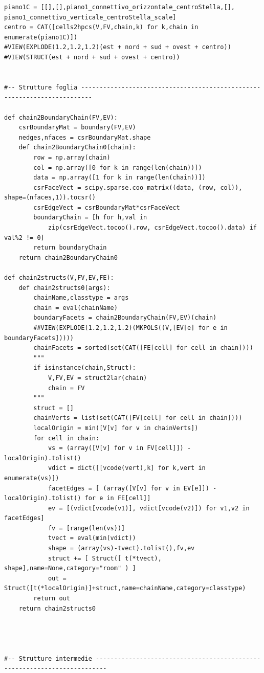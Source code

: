 \documentclass[11pt, oneside]{article}   	%
\begin{document}
\begin{verbatim}
piano1C = [[],[],piano1_connettivo_orizzontale_centroStella,[], piano1_connettivo_verticale_centroStella_scale]
centro = CAT([cells2hpcs(V,FV,chain,k) for k,chain in enumerate(piano1C)])
#VIEW(EXPLODE(1.2,1.2,1.2)(est + nord + sud + ovest + centro))
#VIEW(STRUCT(est + nord + sud + ovest + centro))


#-- Strutture foglia -------------------------------------------------------------------------

def chain2BoundaryChain(FV,EV):
    csrBoundaryMat = boundary(FV,EV)
    nedges,nfaces = csrBoundaryMat.shape   
    def chain2BoundaryChain0(chain):
        row = np.array(chain)
        col = np.array([0 for k in range(len(chain))])
        data = np.array([1 for k in range(len(chain))])
        csrFaceVect = scipy.sparse.coo_matrix((data, (row, col)), shape=(nfaces,1)).tocsr()
        csrEdgeVect = csrBoundaryMat*csrFaceVect
        boundaryChain = [h for h,val in 
            zip(csrEdgeVect.tocoo().row, csrEdgeVect.tocoo().data) if val%2 != 0]
        return boundaryChain
    return chain2BoundaryChain0
 
def chain2structs(V,FV,EV,FE):
    def chain2structs0(args): 
        chainName,classtype = args
        chain = eval(chainName)
        boundaryFacets = chain2BoundaryChain(FV,EV)(chain)
        ##VIEW(EXPLODE(1.2,1.2,1.2)(MKPOLS((V,[EV[e] for e in boundaryFacets]))))
        chainFacets = sorted(set(CAT([FE[cell] for cell in chain])))
        """
        if isinstance(chain,Struct): 
            V,FV,EV = struct2lar(chain)
            chain = FV
        """
        struct = []
        chainVerts = list(set(CAT([FV[cell] for cell in chain])))
        localOrigin = min([V[v] for v in chainVerts])
        for cell in chain:
            vs = (array([V[v] for v in FV[cell]]) - localOrigin).tolist()
            vdict = dict([[vcode(vert),k] for k,vert in enumerate(vs)])
            facetEdges = [ (array([V[v] for v in EV[e]]) - localOrigin).tolist() for e in FE[cell]]
            ev = [(vdict[vcode(v1)], vdict[vcode(v2)]) for v1,v2 in facetEdges]
            fv = [range(len(vs))]
            tvect = eval(min(vdict))
            shape = (array(vs)-tvect).tolist(),fv,ev
            struct += [ Struct([ t(*tvect), shape],name=None,category="room" ) ]
            out = Struct([t(*localOrigin)]+struct,name=chainName,category=classtype)
        return out
    return chain2structs0




#-- Strutture intermedie -------------------------------------------------------------------------


\end{verbatim}
\end{document}
